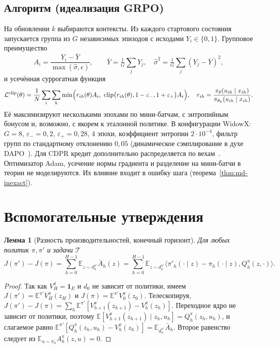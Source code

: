 \documentclass[11pt,a4paper]{article}
\theoremstyle{plain}
\newtheorem{lemma}[theorem]{Лемма}
\theoremstyle{definition}
\theoremstyle{remark}
\newcommand{\E}{\mathbb{E}}
\DeclareMathOperator{\clip}{clip}
\newcommand{\cT}{\mathcal{T}}
\newcommand{\cL}{\mathcal{L}}
\newcommand{\ip}[2]{\langle #1,#2\rangle}
\newcommand{\one}{\mathbf 1}
\begin{document}
\subsection{Алгоритм (идеализация GRPO)}\label{sec:algo}
На обновлении $k$ выбираются контексты. Из каждого стартового состояния запускается группа из $G$ независимых эпизодов с исходами $Y_i\in\{0,1\}$. Групповое преимущество
\begin{equation}\label{eq:grpo-adv}
A_i=\frac{Y_i-\bar Y}{\max(\hat\sigma,\epsilon)},\qquad \bar Y=\tfrac1G\textstyle\sum_jY_j,\quad \hat\sigma^2=\tfrac1G\sum_j(Y_j-\bar Y)^2,
\end{equation}
и усечённая суррогатная функция
\begin{equation}\label{eq:surrogate}
\cL^{\rm clip}(\theta)=\frac1N\sum_{i}\sum_{h}\min\Bigl(r_{ih}(\theta)A_i,\ \clip\bigl(r_{ih}(\theta),1-\varepsilon_-,1+\varepsilon_+\bigr)A_i\Bigr),\quad r_{ih}=\frac{\pi_\theta(u_{ih}\mid x_{ih})}{\pi_{\theta_k}(u_{ih}\mid x_{ih})}.
\end{equation}
Её максимизируют несколькими эпохами по мини-батчам, с энтропийным бонусом и, возможно, с якорем к эталонной политике. В конфигурации WidowX: $G=8$, $\varepsilon_-=0{,}2$, $\varepsilon_+=0{,}28$, 4 эпохи, коэффициент энтропии $2\cdot10^{-4}$, фильтр групп по стандартному отклонению $0{,}05$ (динамическое сэмплирование в духе DAPO~\cite{dapo}). Для CDPR кредит дополнительно распределяется по вехам~\cite{notes}. Оптимизатор Adam, усечение нормы градиента и разделение на мини-батчи в теории не моделируются. Их влияние входит в ошибку шага (теорема~\ref{thm:md-inexact}).

\section{Вспомогательные утверждения}\label{sec:lemmas}

\begin{lemma}[Разность производительностей, конечный горизонт]\label{lem:pdl}
Для любых политик $\pi,\pi'$ и задачи $\cT$
\[
J(\pi')-J(\pi)=\sum_{h=0}^{H-1}\E_{z\sim d^{\pi'}_h}\bar A_h(z)
=\sum_{h=0}^{H-1}\E_{z\sim d^{\pi'}_h}\ip{\pi'_h(\cdot\mid z)-\pi_h(\cdot\mid z)}{Q^\pi_h(z,\cdot)}.
\]
\end{lemma}
\begin{proof}
Так как $V^\pi_H=\one_E$ и $d_0$ не зависит от политики, имеем $J(\pi')=\E^{\pi'}V^\pi_H(z_H)$ и $J(\pi)=\E^{\pi'}V^\pi_0(z_0)$. Телескопируя,
$J(\pi')-J(\pi)=\sum_h\E^{\pi'}[V^\pi_{h+1}(z_{h+1})-V^\pi_h(z_h)]$. Переходное ядро не зависит от политики, поэтому
$\E[V^\pi_{h+1}(z_{h+1})\mid z_h,u_h]=Q^\pi_h(z_h,u_h)$, и слагаемое равно $\E^{\pi'}[Q^\pi_h(z_h,u_h)-V^\pi_h(z_h)]=\E_{d^{\pi'}_h}\bar A_h$. Второе равенство следует из $\E_{u\sim\pi_h}A^\pi_h(z,u)=0$.
\end{proof}
\end{document}
